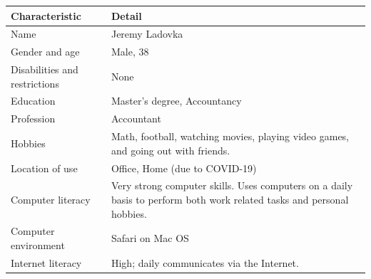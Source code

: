 \documentclass[11pt,onside]{report}
\begin{document}
\begin{center}
    \begin{tabular}{|p{4cm}|p{10cm}|}
        \hline
        \bf{Characteristic} & \bf{Detail} \\
        \hline
        Name &   Jeremy Ladovka \\
        \hline
        Gender and age & Male, 38 \\
        \hline
        Disabilities and restrictions &  None \\
        \hline
        Education & Master's degree, Accountancy \\
        \hline
        Profession & Accountant \\
        \hline
        Hobbies & Math, football, watching movies, playing video games, and going out with friends. \\
        \hline
        Location of use & Office, Home (due to COVID-19) \\
        \hline
        Computer literacy & Very strong computer skills. Uses computers on a daily basis to perform both work related tasks and personal hobbies. \\
        \hline
        Computer environment & Safari on Mac OS \\
        \hline
        Internet literacy &  High; daily communicates via the Internet. \\
        \hline
    \end{tabular}
\end{center}
\end{document}
